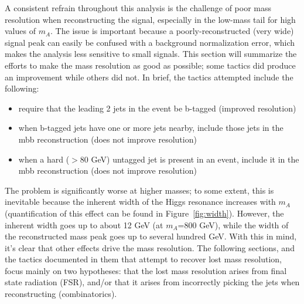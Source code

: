A consistent refrain throughout this analysis is the challenge of poor mass resolution when reconstructing
the signal, especially in the low-mass tail for high values of $m_A$. The 
issue is important because a poorly-reconstructed (very wide)
signal peak can easily be confused with a background normalization error, which makes the analysis less
sensitive to small signals. This section will summarize the efforts to make the mass resolution as good
as possible; some tactics did produce an improvement while others did not.  In brief, the tactics
attempted include the following:

\begin{itemize}
    \item require that the leading 2 jets in the event be b-tagged (improved resolution)
    \item when b-tagged jets have one or more jets nearby, include those jets in the mbb reconstruction (does
not improve resolution)
    \item when a hard ($>$80 GeV) untagged jet is present in an event, include it in the mbb reconstruction
(does not improve resolution)
\end{itemize}


The problem is significantly worse at higher masses;
to some extent, this is inevitable because the inherent width of the Higgs resonance increases with $m_A$
(quantification of this effect can be found in Figure~\ref{fig:width}). However, the inherent width goes up to about 12
GeV (at $m_A$=800 GeV), while the width of the reconstructed mass peak goes up to several hundred GeV.
With this in mind, it’s clear that other effects drive the mass resolution.  The following sections, 
and the tactics documented in them that attempt to recover lost mass resolution, focus mainly 
on two hypotheses: that the lost mass resolution arises from final state radiation (FSR), and/or
that it arises from incorrectly picking the jets when reconstructing (combinatorics). 





